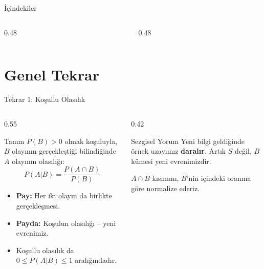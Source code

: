 \documentclass[light]{lutbeamer}
\begin{document}
\begin{frame}{İçindekiler}
  \scriptsize
  \begin{columns}[T]
    \begin{column}{0.48\textwidth}
      \tableofcontents[sections={1-4}]
    \end{column}
    \begin{column}{0.48\textwidth}
      \tableofcontents[sections={5-10}]
    \end{column}
  \end{columns}
\end{frame}


\section*{Genel Tekrar}

\begin{frame}{Tekrar 1: Koşullu Olasılık}
    \begin{columns}[T]
        \begin{column}{0.55\textwidth}
            \begin{block}{Tanım}
                $P(B)>0$ olmak koşuluyla, $B$ olayının gerçekleştiği bilindiğinde $A$ olayının olasılığı:
                \[
                P(A|B) = \frac{P(A \cap B)}{P(B)}
                \]
            \end{block}

            \begin{itemize}
                \item \textbf{Pay:} Her iki olayın da birlikte gerçekleşmesi.
                \item \textbf{Payda:} Koşulun olasılığı -- yeni evrenimiz.
                \item Koşullu olasılık da $0 \le P(A|B) \le 1$ aralığındadır.
            \end{itemize}
        \end{column}
        \begin{column}{0.42\textwidth}
            \begin{exampleblock}{Sezgisel Yorum}
                Yeni bilgi geldiğinde örnek uzayımız \textbf{daralır}. Artık $S$ değil, $B$ kümesi yeni evrenimizdir.

                \vspace{0.2cm}
                $A \cap B$ kısımını, $B$'nin içindeki oranına göre normalize ederiz.
            \end{exampleblock}
        \end{column}
    \end{columns}
\end{frame}
\end{document}
